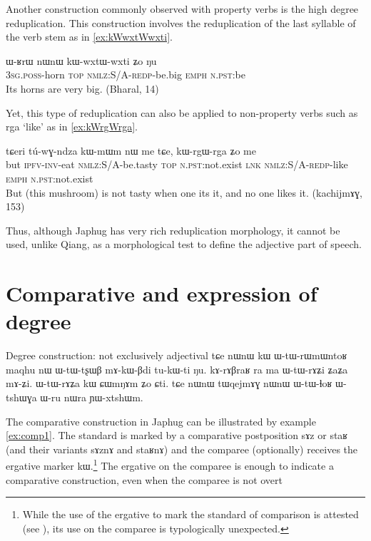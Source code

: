 \documentclass[oldfontcommands,oneside,a4paper,11pt]{article}
\newcommand{\ipa}[1]{{\phon \mbox{#1}}} %
\begin{document}
Another construction commonly observed with property verbs is the high degree reduplication. This construction involves the reduplication of the last syllable of the verb stem as in \ref{ex:kWwxtWwxti}.

\begin{exe}
\ex \label{ex:kWwxtWwxti}
\gll 
\ipa{ɯ-ʁrɯ} 	\ipa{nɯnɯ} 	\ipa{kɯ-wxtɯ-wxti} 	\ipa{ʑo} 	\ipa{ŋu} \\
\textsc{3sg.poss}-horn \textsc{top} \textsc{nmlz:S/A-redp}-be.big \textsc{emph} \textsc{n.pst}:be \\
\glt Its horns are very big. (Bharal, 14)
\end{exe}

Yet, this type of reduplication can also be applied to non-property verbs such as \ipa{rga} `like' as in \ref{ex:kWrgWrga}.
\begin{exe}
\ex \label{ex:kWrgWrga}
\gll 
\ipa{tɕeri} 	\ipa{tú-wɣ-ndza} 	\ipa{kɯ-mɯm} 	\ipa{nɯ} 	\ipa{me} 	\ipa{tɕe,} 	\ipa{kɯ-rgɯ-rga} 	\ipa{ʑo} 	\ipa{me} \\
but \textsc{ipfv-inv}-eat \textsc{nmlz}:S/A-be.tasty \textsc{top} \textsc{n.pst}:not.exist \textsc{lnk} \textsc{nmlz:S/A-redp}-like \textsc{emph}  \textsc{n.pst}:not.exist \\
\glt But (this mushroom) is not  tasty when one its it, and no one likes it. (kachijmɤɣ, 153)
\end{exe}

Thus, although Japhug has very rich reduplication morphology, it cannot be used, unlike Qiang, as a morphological test to define the adjective part of speech.


 \section{Comparative and expression of degree}
 
 
 
 Degree construction: not exclusively adjectival
 tɕe nɯnɯ kɯ ɯ-tɯ-rɯmɯntoʁ maqhu
 nɯ ɯ-tɯ-tʂɯβ mɤ-kɯ-βdi tu-kɯ-ti ŋu.
 kɤ-rɤβraʁ ra ma ɯ-tɯ-rɤʑi ʑaʑa mɤ-ʑi.
 ɯ-tɯ-rɤʑa kɯ ɕɯmŋɤm ʑo ɕti.
 tɕe nɯnɯ tɯqejmɤɣ nɯnɯ ɯ-tɯ-ɬoʁ ɯ-tshɯɣa ɯ-ru nɯra ɲɯ-xtshɯm.
 
The comparative construction in Japhug can be illustrated by example \ref{ex:comp1}. The standard is marked by a comparative postposition \ipa{sɤz} or \ipa{staʁ} (and their variants \ipa{sɤznɤ} and \ipa{staʁnɤ}) and the comparee (optionally) receives the ergative marker \ipa{kɯ}.\footnote{While the use of the ergative to mark the standard of comparison is attested (see \citealt{agent02palancar}), its use on the comparee is typologically unexpected. } The ergative on the comparee is enough to indicate a comparative construction, even when the comparee is not overt 
\end{document}
